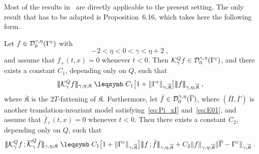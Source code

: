 \documentclass[reqno,11pt]{article}
\def\normDgamma#1{|\!|\!|#1|\!|\!|}
\def\seminormff#1#2{|\!|\!|#1\,\mathord{;}\,#2|\!|\!|}
\def\fraK{\mathfrak{K}}
\def\fraKbar{\overline{\mathfrak{K}}}
\def\Gammabar{\overline\Gamma}
\def\Pibar{\overline\Pi}
\begin{document}
Most of the results in~\cite[Section~6]{Hairer2014} are directly applicable to
the present setting. The only result that has to be adapted is
Proposition~6.16, which takes here the following form.

\begin{prop}
\label{prop:Schauder_D_gamma_eta}
Let $f\in{\mathcal D}_0^{\gamma,\eta}(\Gamma^\varepsilon)$ with  
\begin{equation}
 \label{eq:Schauder_cond_eta_gamma}
 -2 < \eta < 0 < \gamma {}<{} \eta+2\;,
\end{equation} 
and assume that $f_+(t,x) = 0$ whenever $t<0$. 
Then ${\mathcal K}^Q_\gamma f\in{\mathcal D}_0^{\gamma,\eta}(\Gamma^\varepsilon)$, and there exists a
constant $C_1$, depending only on $Q$, such that 
\begin{equation}
\label{eq:Schauder_D_gamma_eta} 
\normDgamma{\cK^Q_\gamma f}_{\gamma,\eta;\fraK} \leqs 
C_1 \bigbrak{1+\norm{\Gamma^\eps}_{\gamma;\fraKbar}}
\normDgamma{f}_{\gamma,\eta;\fraKbar}\;, 
\end{equation}
where $\fraKbar$ is the $2T$-fattening of $\fraK$. Furthermore, let $\bar
f\in\cD_0^{\gamma,\eta}(\Gammabar)$, where $(\Pibar,\Gammabar)$ is another
translation-invariant model satisfying~\eqref{eq:Pi_xI} and~\eqref{eq:E01}, and
assume that $\bar f_+(t,x) = 0$ whenever $t<0$. Then there exists a constant
$C_2$, depending only on $Q$, such that 
\begin{equation}
\label{eq:Schauder_D_gamma_eta2} 
\seminormff{\cK^Q_\gamma f}{\overline\cK^Q_\gamma \bar f}_{\gamma,\eta;\fraK}
\leqs C_1 \bigbrak{1+\norm{\Gamma^\eps}_{\gamma;\fraKbar}}
\seminormff{f}{\bar f}_{\gamma,\eta;\fraKbar}
+ C_2 \norm{f}_{\gamma,\eta;\fraKbar} \norm{\Gammabar -
\Gamma^\eps}_{\gamma;\fraKbar}\;.
\end{equation}
\end{prop}
%
\end{document}
